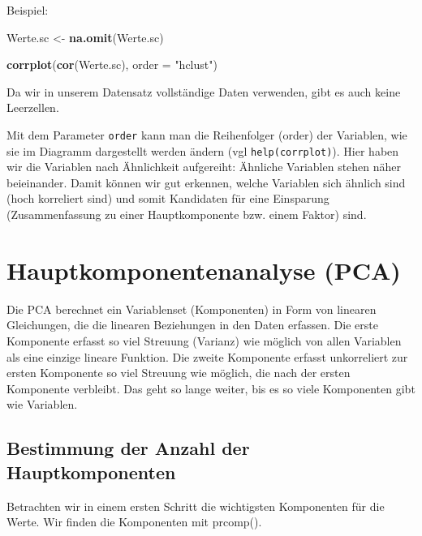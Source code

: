 \documentclass[12pt,ngerman,]{book}
\makeatletter
\newenvironment{Shaded}{\begin{snugshade}}{\end{snugshade}}
\newcommand{\KeywordTok}[1]{\textcolor[rgb]{0.13,0.29,0.53}{\textbf{{#1}}}}
\newcommand{\DataTypeTok}[1]{\textcolor[rgb]{0.13,0.29,0.53}{{#1}}}
\newcommand{\StringTok}[1]{\textcolor[rgb]{0.31,0.60,0.02}{{#1}}}
\newcommand{\NormalTok}[1]{{#1}}
\newenvironment{kframe}{%
\medskip{}
\setlength{\fboxsep}{.8em}
 \def\at@end@of@kframe{}%
 \ifinner\ifhmode%
  \def\at@end@of@kframe{\end{minipage}}%
  \begin{minipage}{\columnwidth}%
 \fi\fi%
 \def\FrameCommand##1{\hskip\@totalleftmargin \hskip-\fboxsep
 \colorbox{shadecolor}{##1}\hskip-\fboxsep
     \hskip-\linewidth \hskip-\@totalleftmargin \hskip\columnwidth}%
 \MakeFramed {\advance\hsize-\width
   \@totalleftmargin\z@ \linewidth\hsize
   \@setminipage}}%
 {\par\unskip\endMakeFramed%
 \at@end@of@kframe}
\renewenvironment{Shaded}{\begin{kframe}}{\end{kframe}}
\theoremstyle{definition}
\theoremstyle{definition}
\theoremstyle{remark}
\makeatother
\begin{document}
Beispiel:

\begin{Shaded}
\begin{Highlighting}[]

\NormalTok{Werte.sc <-}\StringTok{ }\KeywordTok{na.omit}\NormalTok{(Werte.sc)}

\KeywordTok{corrplot}\NormalTok{(}\KeywordTok{cor}\NormalTok{(Werte.sc), }\DataTypeTok{order =} \StringTok{"hclust"}\NormalTok{)}
\end{Highlighting}
\end{Shaded}

Da wir in unserem Datensatz vollständige Daten verwenden, gibt es auch
keine Leerzellen.

Mit dem Parameter \texttt{order} kann man die Reihenfolger (order) der
Variablen, wie sie im Diagramm dargestellt werden ändern (vgl
\texttt{help(corrplot)}). Hier haben wir die Variablen nach Ähnlichkeit
aufgereiht: Ähnliche Variablen stehen näher beieinander. Damit können
wir gut erkennen, welche Variablen sich ähnlich sind (hoch korreliert
sind) und somit Kandidaten für eine Einsparung (Zusammenfassung zu einer
Hauptkomponente bzw. einem Faktor) sind.

\section{Hauptkomponentenanalyse
(PCA)}\label{hauptkomponentenanalyse-pca}

Die PCA berechnet ein Variablenset (Komponenten) in Form von linearen
Gleichungen, die die linearen Beziehungen in den Daten erfassen. Die
erste Komponente erfasst so viel Streuung (Varianz) wie möglich von
allen Variablen als eine einzige lineare Funktion. Die zweite Komponente
erfasst unkorreliert zur ersten Komponente so viel Streuung wie möglich,
die nach der ersten Komponente verbleibt. Das geht so lange weiter, bis
es so viele Komponenten gibt wie Variablen.

\subsection{Bestimmung der Anzahl der
Hauptkomponenten}\label{bestimmung-der-anzahl-der-hauptkomponenten}

Betrachten wir in einem ersten Schritt die wichtigsten Komponenten für
die Werte. Wir finden die Komponenten mit prcomp().
\end{document}
